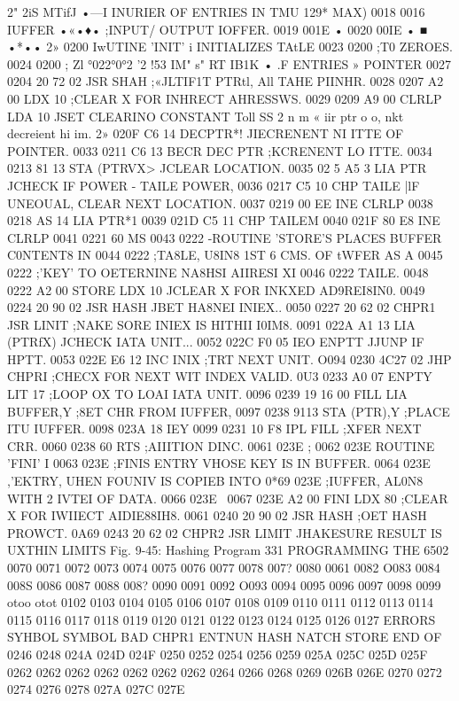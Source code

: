 \documentclass{book}
\begin{document}
{{{{{{{{{{{{{{{{{{{{{{{{{{{{{{{{{{{{{{{{{{{{{{{{{{{{{{{{{{{{{{{{{{{{{{{{{{{{{{{{{{{{{{{{{{2" 2iS MTifJ •—I INURIER OF ENTRIES IN TMU 129* MAX)
0018 0016 IUFFER •«•♦• ;INPUT/ OUTPUT IOFFER.
0019 001E •
0020 00IE • ■ •*••
2» 0200 IwUTINE 'INIT' i INITIALIZES TAtLE
0023 0200 ;T0 ZEROES.
0024 0200 ;
Zl °022°0°2 '2 !53 IM" s" RT IB1K • .F ENTRIES » POINTER
0027 0204 20 72 02 JSR SHAH ;«JLTIF1T PTRtl, All TAHE PIINHR.
0028 0207 A2 00 LDX 10 ;CLEAR X FOR INHRECT AHRESSWS.
0029 0209 A9 00 CLRLP LDA 10 JSET CLEARINO CONSTANT
Toll SS 2 n m « iir ptr o o, nkt decreient hi im.
2» 020F C6 14 DECPTR*! JIECRENENT NI ITTE OF POINTER.
0033 0211 C6 13 BECR DEC PTR ;KCRENENT LO ITTE.
0034 0213 81 13 STA (PTRVX> JCLEAR LOCATION.
0035 02 5 A5 3 LIA PTR JCHECK IF POWER - TAILE POWER,
0036 0217 C5 10 CHP TAILE |lF UNEOUAL, CLEAR NEXT LOCATION.
0037 0219 00 EE INE CLRLP
0038 0218 AS 14 LIA PTR*1
0039 021D C5 11 CHP TAILEM
0040 021F 80 E8 INE CLRLP
0041 0221 60 MS
0043 0222 -ROUTINE 'STORE'S PLACES BUFFER C0NTENT8 IN
0044 0222 ;TA8LE, U8IN8 1ST 6 CMS. OF tWFER AS A
0045 0222 ;'KEY' TO OETERNINE NA8HSI AIIRESI XI
0046 0222 {TAILE.
0048 0222 A2 00 STORE LDX 10 JCLEAR X FOR INKXED AD9REI8IN0.
0049 0224 20 90 02 JSR HASH JBET HA8NEI INIEX..
0050 0227 20 62 02 CHPR1 JSR LINIT ;NAKE SORE INIEX IS HITHII I0IM8.
0091 022A A1 13 LIA (PTRfX) JCHECK IATA UNIT...
0052 022C F0 05 IEO ENPTT JJUNP IF HPTT.
0053 022E E6 12 INC INIX ;TRT NEXT UNIT.
O094 0230 4C27 02 JHP CHPRI ;CHECX FOR NEXT WIT INDEX VALID.
0U3 0233 A0 07 ENPTY LIT 17 ;LOOP OX TO LOAI IATA UNIT.
0096 0239 19 16 00 FILL LIA BUFFER,Y ;8ET CHR FROM IUFFER,
0097 0238 9113 STA (PTR),Y ;PLACE ITU IUFFER.
0098 023A 18 IEY
0099 0231 10 F8 IPL FILL ;XFER NEXT CRR.
0060 0238 60 RTS ;AIIITION DINC.
0061 023E ;
0062 023E {ROUTINE 'FINI' I
0063 023E ;FINIS ENTRY VHOSE KEY IS IN BUFFER.
0064 023E ,'EKTRY, UHEN FOUNIV IS COPIEB INTO
0*69 023E ;IUFFER, AL0N8 WITH 2 IVTEI OF DATA.
0066 023E \
0067 023E A2 00 FINI LDX 80 ;CLEAR X FOR IWIIECT AIDIE88IH8.
0061 0240 20 90 02 JSR HASH ;OET HASH PROWCT.
0A69 0243 20 62 02 CHPR2 JSR LIMIT JHAKESURE RESULT IS UXTHIN LIMITS
Fig. 9-45: Hashing Program
331
PROGRAMMING THE 6502
0070
0071
0072
0073
0074
0075
0076
0077
0078
007?
0080
0061
0082
O083
0084
008S
0086
0087
0088
008?
0090
0091
0092
O093
0094
0095
0096
0097
0098
0099
otoo
otot
0102
0103
0104
0105
0106
0107
0108
0109
0110
0111
0112
0113
0114
0115
0116
0117
0118
0119
0120
0121
0122
0123
0124
0125
0126
0127
ERRORS
SYHBOL
SYMBOL
BAD
CHPR1
ENTNUN
HASH
NATCH
STORE
END OF
0246
0248
024A
024D
024F
0250
0252
0254
0256
0259
025A
025C
025D
025F
0262
0262
0262
0262
0262
0262
0262
0264
0266
0268
0269
026B
026E
0270
0272
0274
0276
0278
027A
027C
027E
}}}}}}}}}}}}}}}}}}}}}}}}}}}}}}}}}}}}}}}}}}}}}}}}}}}}}}}}}}}}}}}}}}}}}}}}}}}}}}}}}}}}}}}}}}}}
\end{document}
